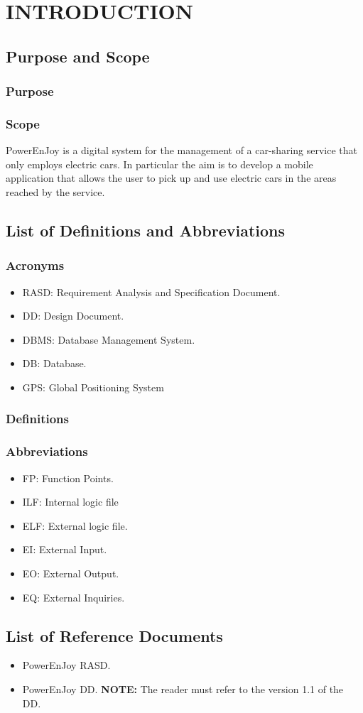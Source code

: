 \section{INTRODUCTION}
\subsection{Purpose and Scope}
\subsubsection{Purpose}


\subsubsection{Scope}
PowerEnJoy is a digital system for the management of a car-sharing service that only employs electric cars. In particular the aim is to develop a mobile application that allows the user to pick up and use electric cars in the areas reached by the service.

\subsection{List of Definitions and Abbreviations} 
\subsubsection{Acronyms}
\begin{itemize}
\item RASD: Requirement Analysis and Specification Document.
\item DD: Design Document.
\item DBMS: Database Management System.
\item DB: Database.

\item GPS: Global Positioning System

\end{itemize}
\subsubsection{Definitions}

\subsubsection{Abbreviations}
\begin{itemize}
	\item  FP: Function Points.
	\item  ILF: Internal logic file
	\item  ELF: External logic file.
	\item  EI: External Input.
	\item  EO: External Output.
	\item  EQ: External Inquiries.
\end{itemize}



\subsection{List of Reference Documents}
\begin{itemize}
	\item PowerEnJoy RASD.	
	\item PowerEnJoy DD.
	\textbf{NOTE:} The reader must refer to the version 1.1 of the DD.
\end{itemize}

